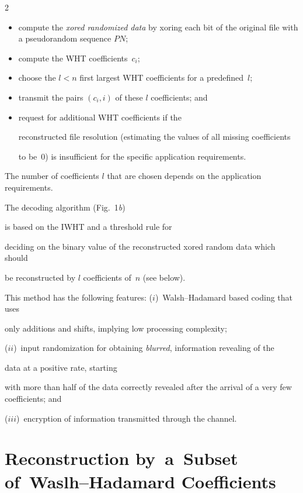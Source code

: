 \begin{multicols}{2}
\begin{itemize}

\item[(a)] compute the {\it xored randomized data} by xoring each bit of the original file with a pseudorandom sequence $PN$;

\item[(b)] compute the WHT coefficients~$c_i$;

\item[(c)]  choose the $l<n$ first largest WHT coefficients for a predefined~$l$;

\item[(d)]  transmit the pairs $(c_i,i)$ of these $l$ coefficients; and

\item[(e)] request for additional WHT coefficients if the

reconstructed file resolution (estimating the values of all missing coefficients 

to be~0) is insufficient for the specific application requirements.

\end{itemize}



The number of coefficients $l$ that are chosen  depends on the application requirements.



The decoding algorithm (Fig.~1\textit{b})

is based on the IWHT and a threshold rule for 

deciding on the binary value of the reconstructed xored random data which should 

be reconstructed  by $l$ coefficients of~$n$ (see below).



This method has the following features:  ($i$)~Walsh--Hadamard based coding that uses 

only additions and shifts, implying low processing complexity; 

($ii$)~input randomization for obtaining {\it blurred}, information revealing of the 

data at a positive rate, starting

with more than half of the data correctly revealed after the arrival of a very few coefficients; and

($iii$)~encryption of information transmitted through the channel.



\section{Reconstruction by~a~Subset of~Waslh--Hadamard Coefficients}




\end{multicols}
